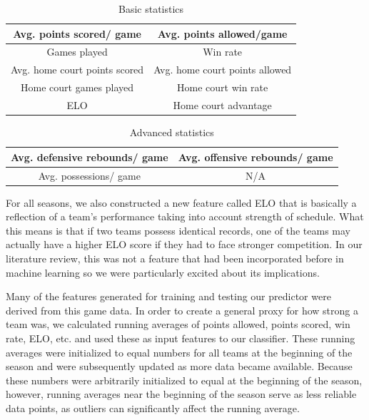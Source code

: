 \documentclass{article}
\begin{document}
\begin{table}
  \begin{center}
    \begin{tabular}{ | c | c |}
      \hline
		Avg. points scored/ game & Avg. points allowed/game  \\ \hline
		Games played & Win rate        \\ \hline
		Avg. home court points scored   & Avg. home court points allowed        \\ \hline
		Home court games played   & Home court win rate      \\ \hline
		ELO & Home court advantage\\ \hline
    \end{tabular}
  \end{center}
  \caption{Basic statistics}
\end{table}

\begin{table}
  \begin{center}
    \begin{tabular}{ | c | c |}
      \hline
		Avg. defensive rebounds/ game & Avg. offensive rebounds/ game  \\ \hline
		Avg. possessions/ game & N/A       \\ \hline
    \end{tabular}
  \end{center}
  \caption{Advanced statistics}
\end{table}


For all seasons, we also constructed a new feature called ELO that is basically a reflection of a team's performance taking into account strength of schedule. What this means is that if two teams possess identical records, one of the teams may actually have a higher ELO score if they had to face stronger competition. In our literature review, this was not a feature that had been incorporated before in machine learning so we were particularly excited about its implications.

Many of the features generated for training and testing our predictor were derived from this game data. In order to create a general proxy for how strong a team was, we calculated running averages of points allowed, points scored, win rate, ELO, etc. and used these as input features to our classifier. These running averages were initialized to equal numbers for all teams at the beginning of the season and were subsequently updated as more data became available. Because these numbers were arbitrarily initialized to equal at the beginning of the season, however, running averages near the beginning of the season serve as less reliable data points, as outliers can significantly affect the running average.
\end{document}
